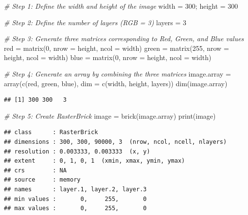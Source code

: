 \documentclass[
  12pt,
]{style/krantz}
\newenvironment{Shaded}{\begin{snugshade}}{\end{snugshade}}
\newcommand{\AttributeTok}[1]{\textcolor[rgb]{0.77,0.63,0.00}{#1}}
\newcommand{\CommentTok}[1]{\textcolor[rgb]{0.56,0.35,0.01}{\textit{#1}}}
\newcommand{\DecValTok}[1]{\textcolor[rgb]{0.00,0.00,0.81}{#1}}
\newcommand{\FunctionTok}[1]{\textcolor[rgb]{0.00,0.00,0.00}{#1}}
\newcommand{\NormalTok}[1]{#1}
\newcommand{\OtherTok}[1]{\textcolor[rgb]{0.56,0.35,0.01}{#1}}
\begin{document}
\begin{Shaded}
\begin{Highlighting}[]
\CommentTok{\# Step 1: Define the width and height of the image}
\NormalTok{width }\OtherTok{=} \DecValTok{300}\NormalTok{; }
\NormalTok{height }\OtherTok{=} \DecValTok{300}

\CommentTok{\# Step 2: Define the number of layers (RGB = 3)}
\NormalTok{layers }\OtherTok{=} \DecValTok{3}

\CommentTok{\# Step 3: Generate three matrices corresponding to Red, Green, and Blue values}
\NormalTok{red }\OtherTok{=} \FunctionTok{matrix}\NormalTok{(}\DecValTok{0}\NormalTok{, }\AttributeTok{nrow =}\NormalTok{ height, }\AttributeTok{ncol =}\NormalTok{ width)}
\NormalTok{green }\OtherTok{=} \FunctionTok{matrix}\NormalTok{(}\DecValTok{255}\NormalTok{, }\AttributeTok{nrow =}\NormalTok{ height, }\AttributeTok{ncol =}\NormalTok{ width)}
\NormalTok{blue }\OtherTok{=} \FunctionTok{matrix}\NormalTok{(}\DecValTok{0}\NormalTok{, }\AttributeTok{nrow =}\NormalTok{ height, }\AttributeTok{ncol =}\NormalTok{ width)}

\CommentTok{\# Step 4: Generate an array by combining the three matrices}
\NormalTok{image.array }\OtherTok{=} \FunctionTok{array}\NormalTok{(}\FunctionTok{c}\NormalTok{(red, green, blue), }\AttributeTok{dim =} \FunctionTok{c}\NormalTok{(width, height, layers))}
\FunctionTok{dim}\NormalTok{(image.array)}
\end{Highlighting}
\end{Shaded}

\begin{verbatim}
## [1] 300 300   3
\end{verbatim}

\begin{Shaded}
\begin{Highlighting}[]
\CommentTok{\# Step 5: Create RasterBrick}
\NormalTok{image }\OtherTok{=} \FunctionTok{brick}\NormalTok{(image.array)}
\FunctionTok{print}\NormalTok{(image)}
\end{Highlighting}
\end{Shaded}

\begin{verbatim}
## class      : RasterBrick 
## dimensions : 300, 300, 90000, 3  (nrow, ncol, ncell, nlayers)
## resolution : 0.003333, 0.003333  (x, y)
## extent     : 0, 1, 0, 1  (xmin, xmax, ymin, ymax)
## crs        : NA 
## source     : memory
## names      : layer.1, layer.2, layer.3 
## min values :       0,     255,       0 
## max values :       0,     255,       0
\end{verbatim}
\end{document}
